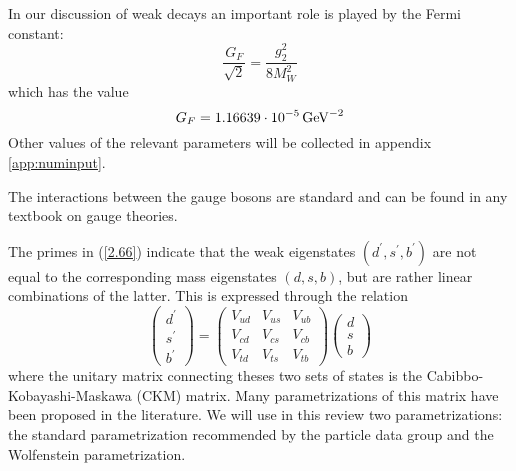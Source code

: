 In our discussion of weak decays an important role is played by
the Fermi constant:
\begin{equation}\label{2.100}
\frac{G_F}{\sqrt{2}}=\frac{g^2_2}{8 M^2_W}
\end{equation}
which has the value
\begin{equation}\label{2.98}
G_F=1.16639\cdot 10^{-5}\, {\rm GeV}^{-2}
\end{equation}
Other values of the relevant parameters will be collected in appendix
\ref{app:numinput}. 

The interactions between the gauge bosons are standard and can be
found in any textbook on gauge theories.

The primes in (\ref{2.66}) indicate that the weak eigenstates 
$(d^\prime,s^\prime,b^\prime)$ are not equal to the corresponding
mass eigenstates $(d,s,b)$, but are rather linear combinations of
the latter. This is expressed through the relation
\begin{equation}\label{2.67}
\left(\begin{array}{c}
d^\prime \\ s^\prime \\ b^\prime
\end{array}\right)=
\left(\begin{array}{ccc}
V_{ud}&V_{us}&V_{ub}\\
V_{cd}&V_{cs}&V_{cb}\\
V_{td}&V_{ts}&V_{tb}
\end{array}\right)
\left(\begin{array}{c}
d \\ s \\ b
\end{array}\right)
\end{equation}
where the unitary matrix connecting theses two sets of states is the
Cabibbo-Kobayashi-Maskawa (CKM) matrix.  Many parametrizations of this
matrix have been proposed in the literature.  We will use in this
review two parametrizations:  the standard parametrization
recommended by the particle data group and the Wolfenstein
parametrization.

